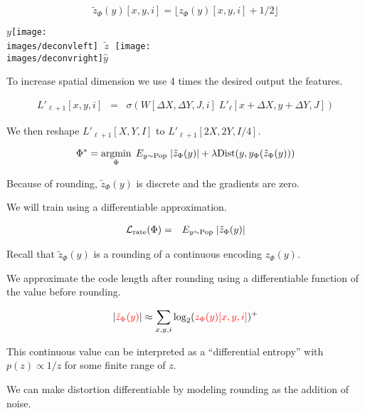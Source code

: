 {\vfill
$$\tilde{z}_\Phi(y)[x,y,i] = \lfloor z_\Phi(y)[x,y,i] + 1/2 \rfloor$$


\centerline{$y$\texttt{[image: \\images/deconvleft]} $\;\tilde{z}\;$ \texttt{[image: \\images/deconvright]}$\hat{y}$}


\vfill
To increase spatial dimension we use 4 times the desired output the features.

\begin{eqnarray*}
  L'_{\ell+1}[x,y,i] & = & \sigma\left(W[\Delta X, \Delta Y, J,i]\; L'_\ell[x + \Delta X, y + \Delta Y, J]\right)
\end{eqnarray*}

\vfill
We then reshape $L'_{\ell+1}[X,Y,I]$ to $L'_{\ell+1}[2X,2Y,I/4]$.


$$\Phi^* = \operatorname*{argmin}_\Phi \;E_{y \sim \mathrm{Pop}}\;|\tilde{z}_\Phi(y)| + \lambda \mathrm{Dist}(y,y_\Phi(\tilde{z}_\Phi(y)))$$

\vfill
Because of rounding, $\tilde{z}_\Phi(y)$ is discrete and the gradients are zero.

\vfill
We will train using a differentiable approximation.


\begin{eqnarray*}
{\cal L}_{\mathrm{rate}}(\Phi) & = & E_{y \sim \mathrm{Pop}}\;|\tilde{z}_\Phi(y)|
\end{eqnarray*}

\vfill
Recall that {\color{red} $\tilde{z}_\Phi(y)$} is a rounding of a continuous encoding {\color{red} $z_\Phi(y)$}.

\vfill
We approximate the code length after rounding using a differentiable function of the value before rounding.

\vfill
{\color{red} $$|{\color{red} \tilde{z}_\Phi(y)}| \approx \sum_{x,y,i} \log_2({\color{red} z_\Phi(y)[x,y,i]})^+$$}

This continuous value can be interpreted as a ``differential entropy'' with $p(z) \propto 1/z$ for some finite range of $z$.


We can make distortion differentiable by modeling rounding as the addition of noise.

}
